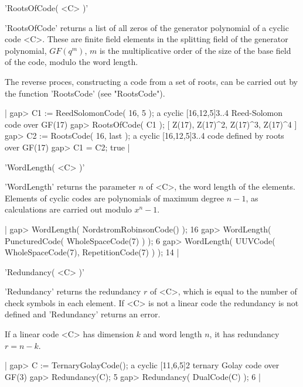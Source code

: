 
'RootsOfCode( <C> )'

'RootsOfCode' returns a list of all zeros of  the generator polynomial of
a cyclic code <C>. These are finite field elements in the splitting field
of the generator  polynomial, $GF(q^m)$, $m$  is the multiplicative order
of the size of the base field of the code, modulo the word length.

The reverse  proces, constructing  a code from  a set  of roots,  can  be
carried out by the function 'RootsCode' (see "RootsCode").

|    gap> C1 := ReedSolomonCode( 16, 5 );
    a cyclic [16,12,5]3..4 Reed-Solomon code over GF(17)
    gap> RootsOfCode( C1 );
    [ Z(17), Z(17)^2, Z(17)^3, Z(17)^4 ]
    gap> C2 := RootsCode( 16, last );
    a cyclic [16,12,5]3..4 code defined by roots over GF(17)
    gap> C1 = C2;
    true |


'WordLength( <C> )'

'WordLength' returns the  parameter $n$ of  <C>,  the word length of  the
elements. Elements of  cyclic   codes are polynomials of   maximum degree
$n-1$, as calculations are carried out modulo $x^{n}-1$.

|    gap> WordLength( NordstromRobinsonCode() );
    16
    gap> WordLength( PuncturedCode( WholeSpaceCode(7) ) );
    6
    gap> WordLength( UUVCode( WholeSpaceCode(7), RepetitionCode(7) ) );
    14 |


'Redundancy( <C> )'

'Redundancy' returns the redundancy  $r$ of <C>, which   is equal to  the
number of check symbols in each element. If <C> is not  a linear code the
redundancy is not defined and 'Redundancy' returns an error.

If   a linear code   <C> has dimension $k$  and  word length  $n$, it has
redundancy $r=n-k$.

|    gap> C := TernaryGolayCode();
    a cyclic [11,6,5]2 ternary Golay code over GF(3)
    gap> Redundancy(C);
    5
    gap> Redundancy( DualCode(C) );
    6 |


